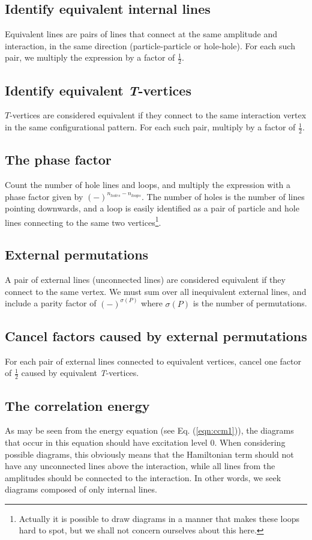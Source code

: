 \subsection{Identify equivalent internal lines}
Equivalent lines are pairs of lines that connect at the same amplitude
and interaction, in the same direction (particle-particle or
hole-hole). For each such pair, we multiply the expression by a factor
of $\frac{1}{2}$.

\subsection{Identify equivalent \emph{T}-vertices}
$T$-vertices are considered equivalent if they connect to the same
interaction vertex in the same configurational pattern. For each such
pair, multiply by a factor of $\frac{1}{2}$.

\subsection{The phase factor}
Count the number of hole lines and loops, and multiply the expression
with a phase factor given by $(-)^{n_{holes}-n_{loops}}$. The number
of holes is the number of lines pointing downwards, and a loop is
easily identified as a pair of particle and hole lines connecting to
the same two vertices\footnote{Actually it is possible to draw
  diagrams in a manner that makes these loops hard to spot, but we
  shall not concern ourselves about this here.}.

\subsection{External permutations}
A pair of external lines (unconnected lines) are considered equivalent
if they connect to the same vertex. We must sum over all inequivalent
external lines, and include a parity factor of $(-)^{\sigma(P)}$ where
$\sigma(P)$ is the number of permutations.

\subsection{Cancel factors caused by external permutations}
For each pair of external lines connected to equivalent vertices, cancel one factor of $\frac{1}{2}$ caused by equivalent \emph{T}-vertices. 

\subsection{The correlation energy}
As may be seen from the energy equation (see Eq. (\ref{eqn:ccm1})), the diagrams that occur in this equation should have excitation level 0. When considering possible diagrams, this obviously means that the Hamiltonian term should not have any unconnected lines above the interaction, while all lines from the amplitudes should be connected to the interaction. In other words, we seek diagrams composed of only internal lines.

